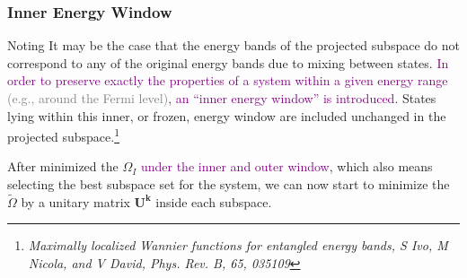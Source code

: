 \documentclass{beamer}
\begin{document}
  \begin{frame}
    \frametitle{Inner Energy Window}

    \begin{block}{Noting}
      It may be the case that the energy bands of the projected subspace do not correspond to any of the original energy bands due to mixing between states. \textcolor{purple}{In order to preserve exactly the properties of a system within a given energy range \textcolor{gray}{(e.g., around the Fermi level)}, an ``inner energy window'' is introduced.} States lying within this inner, or frozen, energy window are included unchanged in the projected subspace.\footnote{\tiny\emph{Maximally localized Wannier functions for entangled energy bands, S Ivo, M Nicola, and V David, Phys. Rev. B, 65, 035109}}
    \end{block}

    After minimized the \(\Omega_I\) \textcolor{purple}{under the inner and outer window}, which also means selecting the best subspace set for the system, we can now start to minimize the \(\widetilde{\Omega}\) by a unitary matrix \(\mathbf{U}^{\mathbf{k}}\) inside each subspace.

  \end{frame}
\end{document}
